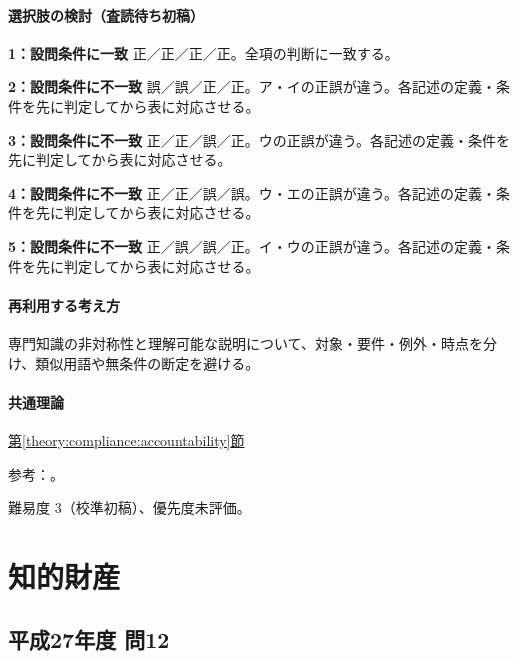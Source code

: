 \paragraph{選択肢の検討（査読待ち初稿）}\mbox{}\par

\noindent\textbf{1：設問条件に一致} 正／正／正／正。全項の判断に一致する。\par

\noindent\textbf{2：設問条件に不一致} 誤／誤／正／正。ア・イの正誤が違う。各記述の定義・条件を先に判定してから表に対応させる。\par

\noindent\textbf{3：設問条件に不一致} 正／正／誤／正。ウの正誤が違う。各記述の定義・条件を先に判定してから表に対応させる。\par

\noindent\textbf{4：設問条件に不一致} 正／正／誤／誤。ウ・エの正誤が違う。各記述の定義・条件を先に判定してから表に対応させる。\par

\noindent\textbf{5：設問条件に不一致} 正／誤／誤／正。イ・ウの正誤が違う。各記述の定義・条件を先に判定してから表に対応させる。\par

\paragraph{再利用する考え方} 専門知識の非対称性と理解可能な説明について、対象・要件・例外・時点を分け、類似用語や無条件の断定を避ける。

\paragraph{共通理論} \hyperref[theory:compliance:accountability]{第\ref*{theory:compliance:accountability}節}

\par 参考：\cite{ipej_ethics2011,ieej_conduct2007}。

\par 難易度 3（校準初稿）、優先度未評価。

\section{知的財産}

\subsection{平成27年度 問12}
\label{q:h27-reg-apt-12}

